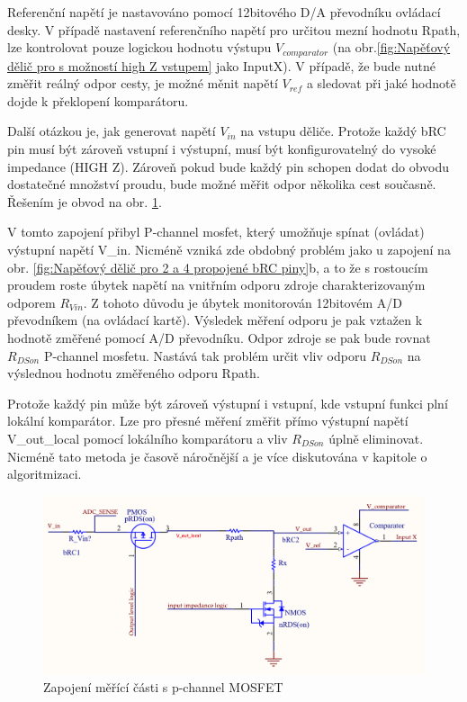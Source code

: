 Referenční napětí je nastavováno pomocí 12bitového D/A převodníku ovládací desky. V případě nastavení referenčního napětí
pro určitou mezní hodnotu Rpath,
lze kontrolovat pouze logickou hodnotu výstupu $V_{comparator}$
(na obr.\ref{fig:Napěťový dělič pro s možností high Z vstupem} jako InputX).
V případě, že bude nutné změřit reálný odpor cesty, je možné měnit napětí $V_{ref}$ a sledovat při jaké hodnotě dojde k překlopení komparátoru.\par

Další otázkou je, jak generovat napětí $V_{in}$ na vstupu děliče.
Protože každý bRC pin musí být zároveň vstupní i výstupní, musí být konfigurovatelný do vysoké impedance (HIGH Z).
Zároveň pokud bude každý pin schopen dodat do obvodu dostatečné množství proudu,
bude možné měřit odpor několika cest současně.
Řešením je obvod na obr. \ref{fig:Zapojení měřící části s p-channel MOSFET}.\par

V tomto zapojení přibyl P-channel mosfet,
který umožňuje spínat (ovládat) výstupní napětí V\_in.
Nicméně vzniká zde obdobný problém jako u zapojení na obr. \ref{fig:Napěťový dělič pro 2 a 4 propojené bRC piny}b, a to
že s rostoucím proudem roste úbytek napětí na vnitřním odporu zdroje charakterizovaným
odporem $R_{Vin}$. Z tohoto důvodu je úbytek monitorován 12bitovém A/D převodníkem (na ovládací kartě).
Výsledek měření odporu je pak vztažen k hodnotě změřené pomocí A/D převodníku.
Odpor zdroje se pak bude rovnat $R_{DSon}$ P-channel mosfetu.
Nastává tak problém určit vliv odporu $R_{DSon}$ na výslednou hodnotu změřeného odporu Rpath\cite{HOROWITZ,MARTINT}.
\clearpage

Protože každý pin může být zároveň výstupní i vstupní, kde vstupní funkci plní lokální komparátor.
Lze pro přesné měření změřit přímo výstupní napětí V\_out\_local pomocí lokálního komparátoru a vliv $R_{DSon}$ úplně eliminovat.
Nicméně tato metoda je časově náročnější a je více diskutována v kapitole o algoritmizaci.\par
    
\begin{figure}[ht!]
    \centering
    \includegraphics[width = 1\textwidth]{obrazky/final_connection.png}
    \caption{Zapojení měřící části s p-channel MOSFET}
    \label{fig:Zapojení měřící části s p-channel MOSFET}
\end{figure}

